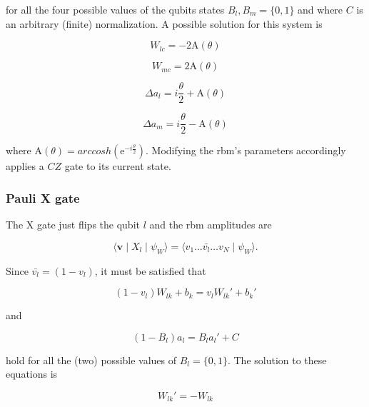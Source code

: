 for all the four possible values of the qubits states $B_{l}, B_{m} = \{0,1\}$ and where $C$ is an arbitrary (finite)
normalization. A possible solution for this system is

\begin{equation}
   W_{lc} = -2\mathrm{A}(\theta) 
\end{equation}

\begin{equation}
   W_{mc} = 2\mathrm{A}(\theta) 
\end{equation}

\begin{equation}
   \Delta a_{l} = i \frac{\theta}{2} + \mathrm{A}(\theta)
\end{equation}

\begin{equation}
   \Delta a_{m} = i \frac{\theta}{2} - \mathrm{A}(\theta)
\end{equation}

where $\mathrm{A}(\theta) = arccosh(\mathrm{e}^{-i \frac{\theta}{2}})$. Modifying the \gls{rbm}'s parameters 
accordingly applies a $CZ$ gate to its current state.

\subsubsection{Pauli X gate}
The X gate just flips the qubit $l$ and the \gls{rbm} amplitudes are

\begin{equation}
    \langle \bm{v} \mid X_{l} \mid \psi_{W}  \rangle = 
    \langle v_{1} \dots \bar{v_{l}} \dots v_{N} \mid \psi_{W} \rangle.
\end{equation}

Since $\bar{v_{l}} = (1-v_{l})$, it must be satisfied that

\begin{equation}
    (1-v_{l})W_{lk} + b_{k} = v_{l} W_{lk}\prime + b_{k}\prime
\end{equation}

and

\begin{equation}
   (1-B_{l}) a_{l} = B_{l} a_{l}\prime + C 
\end{equation}

hold for all the (two) possible values of $B_{l} = \{0,1\}$. The solution to these equations is

\begin{equation}
   W_{lk}\prime = -W_{lk}
\end{equation}

